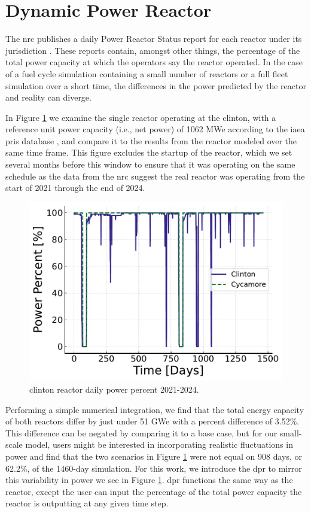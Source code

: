 \section{Dynamic Power Reactor}
\label{sec:dpr_method}

The \gls{nrc} publishes a daily Power Reactor Status report for each reactor
under its jurisdiction \cite{nrc_power_2025}. These reports contain, amongst
other things, the percentage of the total power capacity at which the operators
say the reactor operated. In the case of a fuel cycle simulation containing a
small number of reactors or a full fleet simulation over a short time, the
differences in the power predicted by the \cycamore reactor and reality can
diverge.

In Figure \ref{fig:pp_full} we examine the single reactor operating at the
\gls{clinton}, with a reference unit power capacity (i.e., net power) of 1062
MWe according to the \gls{iaea} \gls{pris} database \cite{IAEA_PRIS}, and
compare it to the results from the \cycamore reactor modeled over the same time
frame. This figure excludes the startup of the \cycamore reactor, which we set
several months before this window to ensure that it was operating on the same
schedule as the data from the \gls{nrc} suggest the real reactor was operating
from the start of 2021 through the end of 2024.

\begin{figure}[H]
  \centering
  \includegraphics[width=0.7\linewidth]{images/power_reactor/power_percent_clinton_fake.pdf}
  \caption{\gls{clinton} reactor daily power percent 2021-2024.}
  \label{fig:pp_full}
\end{figure}

Performing a simple numerical integration, we find that the total energy
capacity of both reactors differ by just under 51 GWe with a percent difference
of 3.52\%. This difference can be negated by comparing it to a base case, but
for our small-scale model, users might be interested in incorporating realistic
fluctuations in power and find that the two scenarios in Figure
\ref{fig:pp_full} were not equal on 908 days, or 62.2\%, of the 1460-day
simulation. For this work, we introduce the \gls{dpr} to mirror this
variability in power we see in Figure \ref{fig:pp_full}. \gls{dpr} functions
the same way as the \cycamore reactor, except the user can input the percentage
of the total power capacity the reactor is outputting at any given time step.


